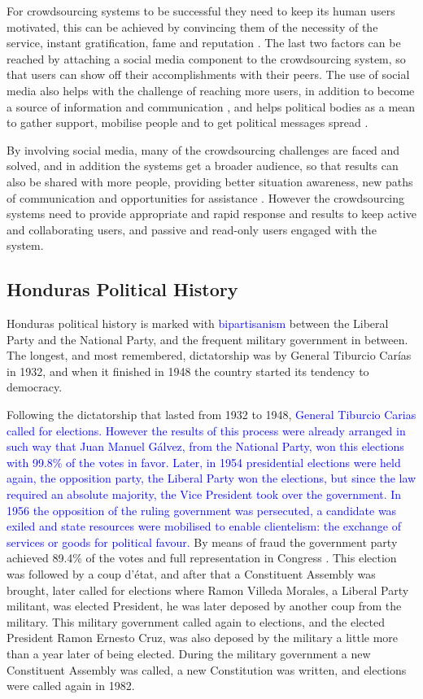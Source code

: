 \documentclass[letterpaper,10pt]{article}
\begin{document}
For crowdsourcing systems to be successful they need to keep its human users motivated, this can be achieved by convincing them of the necessity of the service, instant gratification, fame and reputation \citep{doan2011}. The last two factors can be reached by attaching a social media component to the crowdsourcing system, so that users can show off their accomplishments with their peers. The use of social media also helps with the challenge of reaching more users, in addition to become a source of information and communication \citep{yin2012}, and helps political bodies as a mean to gather support, mobilise people and to get political messages spread \citep{map2014}.

By involving social media, many of the crowdsourcing challenges are faced and solved, and in addition the systems get a broader audience, so that results can also be shared with more people, providing better situation awareness, new paths of communication and opportunities for assistance \citep{gao2011}. However the crowdsourcing systems need to provide appropriate and rapid response and results to keep active and collaborating users, and passive and read-only users engaged with the system.


\subsection{Honduras Political History}

Honduras political history is marked with \textcolor{blue}{bipartisanism} between the Liberal Party and the National Party, and the frequent military government in between. The longest, and most remembered, dictatorship was by General Tiburcio Carías in 1932, and when it finished in 1948 the country started its tendency to democracy.

Following the dictatorship that lasted from 1932 to 1948, \textcolor{blue}{General Tiburcio Carias called for elections. However the results of this process were already arranged in such way that Juan Manuel Gálvez, from the National Party, won this elections with 99.8\% of the votes in favor. Later, in 1954 presidential elections were held again, the opposition party, the Liberal Party won the elections, but since the law required an absolute majority, the Vice President took over the government. In 1956 the opposition of the ruling government was persecuted, a candidate was exiled and state resources were mobilised to enable clientelism: the exchange of services or goods for political favour.} By means of fraud the government party achieved 89.4\% of the votes and full representation in Congress \citep{romero2014}. This election was followed by a coup d'\'{e}tat, and after that a Constituent Assembly was brought, later called for elections where Ramon Villeda Morales, a Liberal Party militant, was elected President, he was later deposed by another coup from the military. This military government called again to elections, and the elected President Ramon Ernesto Cruz, was also deposed by the military a little more than a year later of being elected. During the military government a new Constituent Assembly was called, a new Constitution was written, and elections were called again in 1982.
\end{document}
